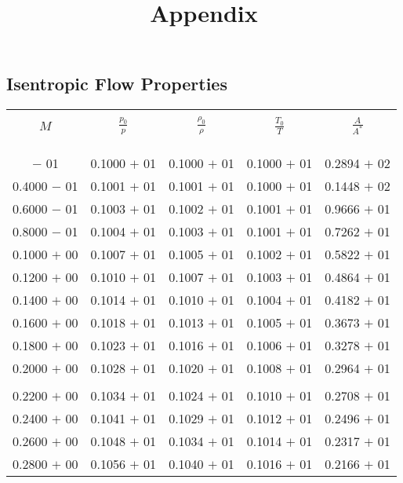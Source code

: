 \documentclass[a4paper,11pt]{article}
\title{Appendix}
\author{}
\date{}
\begin{document}
\maketitle
\begin{center}
\section*{\huge Isentropic Flow Properties}
\setlength\tabcolsep{10pt}
\begin{longtable}{ c c c c c }
\hline \\ $M$ & $\frac{p_0}{p}$ & $\frac{\rho_0}{\rho}$ & $\frac{T_0}{T}$ & $\frac{A}{A^\ast}$ \\ \\ \hline \\ 
\endhead
\\ \hline \endlastfoot
0.2000 $-$ 01 & 0.1000 $+$ 01 & 0.1000 $+$ 01 & 0.1000 $+$ 01 & 0.2894 $+$ 02 \\
0.4000 $-$ 01 & 0.1001 $+$ 01 & 0.1001 $+$ 01 & 0.1000 $+$ 01 & 0.1448 $+$ 02 \\
0.6000 $-$ 01 & 0.1003 $+$ 01 & 0.1002 $+$ 01 & 0.1001 $+$ 01 & 0.9666 $+$ 01 \\
0.8000 $-$ 01 & 0.1004 $+$ 01 & 0.1003 $+$ 01 & 0.1001 $+$ 01 & 0.7262 $+$ 01 \\
0.1000 $+$ 00 & 0.1007 $+$ 01 & 0.1005 $+$ 01 & 0.1002 $+$ 01 & 0.5822 $+$ 01 \\
0.1200 $+$ 00 & 0.1010 $+$ 01 & 0.1007 $+$ 01 & 0.1003 $+$ 01 & 0.4864 $+$ 01 \\
0.1400 $+$ 00 & 0.1014 $+$ 01 & 0.1010 $+$ 01 & 0.1004 $+$ 01 & 0.4182 $+$ 01 \\
0.1600 $+$ 00 & 0.1018 $+$ 01 & 0.1013 $+$ 01 & 0.1005 $+$ 01 & 0.3673 $+$ 01 \\
0.1800 $+$ 00 & 0.1023 $+$ 01 & 0.1016 $+$ 01 & 0.1006 $+$ 01 & 0.3278 $+$ 01 \\
0.2000 $+$ 00 & 0.1028 $+$ 01 & 0.1020 $+$ 01 & 0.1008 $+$ 01 & 0.2964 $+$ 01 \\
\\
0.2200 $+$ 00 & 0.1034 $+$ 01 & 0.1024 $+$ 01 & 0.1010 $+$ 01 & 0.2708 $+$ 01 \\
0.2400 $+$ 00 & 0.1041 $+$ 01 & 0.1029 $+$ 01 & 0.1012 $+$ 01 & 0.2496 $+$ 01 \\
0.2600 $+$ 00 & 0.1048 $+$ 01 & 0.1034 $+$ 01 & 0.1014 $+$ 01 & 0.2317 $+$ 01 \\
0.2800 $+$ 00 & 0.1056 $+$ 01 & 0.1040 $+$ 01 & 0.1016 $+$ 01 & 0.2166 $+$ 01 \\

\end{longtable}
\end{center}
\end{document}
